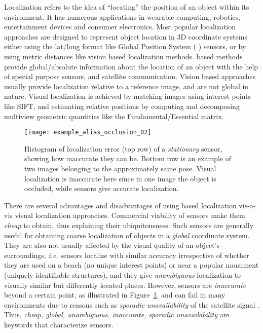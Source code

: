Localization refers to the idea of ``locating'' the position of 
an object within its environment. 
It has numerous applications in
wearable computing, robotics, entertainment devices and consumer electronics. 
Most popular localization approaches
are designed to represent object location in 3D coordinate systems
either using the lat/long format like Global Position System ( \gps) sensors, or by using 
metric distances like vision based localization methods.
\gps based methods provide global/absolute information about the location of an object
with the help of special purpose sensors, and satellite communication. Vision based
approaches usually provide localization relative to a reference image, and are not
global in nature. Visual localization is achieved by matching images using
interest points like SIFT, and estimating relative positions by computing and decomposing
multiview geometric quantities like the Fundamental/Essential matrix.
\begin{figure}[t]
\centering
\texttt{[image: example\_alias\_occlusion\_02]}
\caption{Histogram of \gps localization error (top row) of a \emph{stationary} \gps sensor, showing
how inaccurate they can be. Bottom row is an example of two images belonging to the approximately same pose.
Visual localization is inaccurate here since in one image the object is occluded,
while \gps sensors give accurate localization.}
\label{fig:example_alias_occlusion_01}
\end{figure}
There are several advantages and disadvantages of using \gps based localization
vis-a-vis visual localization approaches. Commercial viability of \gps sensors
make them \emph{cheap} to obtain, thus explaining their ubiquitousness. Such sensors are 
generally useful for obtaining coarse localization of objects in a \emph{global} coordinate
system. They are also not usually affected by the visual quality of an object's surroundings, 
\emph{i.e.} \gps sensors localize with similar accuracy irrespective of whether
they are used on a beach (no unique interest points) or near a popular monument (uniquely
identifiable structures), and they give \emph{unambiguous} localization to 
visually similar but differently located places.  However, \gps sensors are \emph{inaccurate} beyond a certain point, as
illustrated in Figure~\ref{fig:example_alias_occlusion_01}, and can fail in 
many environments due to reasons such as \emph{sporadic unavailability} of the satellite signal \cite{maier2010improved}. 
Thus, \emph{cheap, global, unambiguous, inaccurate, sporadic unavailability} are keywords
that characterize \gps sensors.

